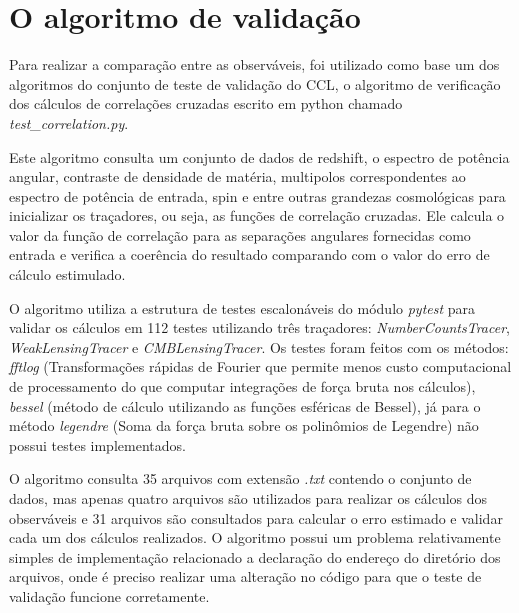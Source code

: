 \section*{O algoritmo de validação}

Para realizar a comparação entre as observáveis, foi utilizado como base um dos algoritmos do conjunto de teste de validação do CCL, o algoritmo de verificação dos cálculos de correlações cruzadas escrito em python chamado  \textit{test\_correlation.py}.

Este algoritmo consulta um conjunto de dados de redshift, o espectro de potência angular, contraste de densidade de matéria, multipolos correspondentes ao espectro de potência de entrada, spin e entre outras grandezas cosmológicas para inicializar os traçadores, ou seja, as funções de correlação cruzadas. Ele calcula o valor da função de correlação para as separações angulares fornecidas como entrada e verifica a coerência do resultado comparando com o valor do erro de cálculo estimulado.

O algoritmo utiliza a estrutura de testes escalonáveis do módulo \textit{pytest} para validar os cálculos em 112 testes utilizando três traçadores:  \textit{NumberCountsTracer}, \textit{WeakLensingTracer} e \textit{CMBLensingTracer}. Os testes foram feitos com os métodos: \textit{fftlog} (Transformações rápidas de Fourier que permite menos custo computacional de processamento do que computar integrações de força bruta nos cálculos), \textit{bessel} (método de cálculo utilizando as funções esféricas de Bessel), já para o método \textit{legendre} (Soma da força bruta sobre os polinômios de Legendre) não possui testes implementados.

O algoritmo consulta 35 arquivos com extensão \textit{.txt} contendo o conjunto de dados, mas apenas quatro arquivos são utilizados para realizar os cálculos dos observáveis e 31 arquivos são consultados para calcular o erro estimado e validar cada um dos cálculos realizados. O algoritmo possui um problema relativamente simples de implementação relacionado a declaração do endereço do diretório dos arquivos, onde é preciso realizar uma alteração no código para que o teste de validação funcione corretamente. 

